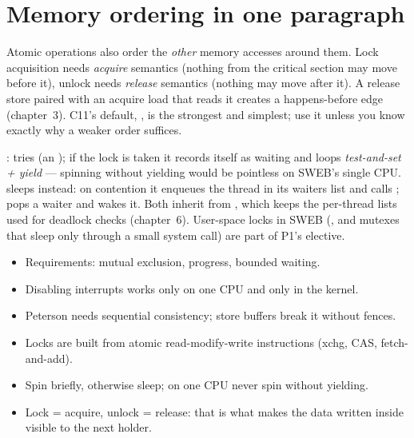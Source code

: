 \section{Memory ordering in one paragraph}

Atomic operations also order the \emph{other} memory accesses around
them. Lock acquisition needs \emph{acquire} semantics (nothing from the
critical section may move before it), unlock needs \emph{release}
semantics (nothing may move after it). A release store paired with an
acquire load that reads it creates a happens-before edge (chapter~3).
C11's default, , is the strongest and
simplest; use it unless you know exactly why a weaker order suffices.

\begin{swebbox}
:  tries
 (an ); if the lock is taken it
records itself as waiting and loops \emph{test-and-set + yield} ---
spinning without yielding would be pointless on SWEB's single CPU.
 sleeps instead: on contention it enqueues the thread in its
waiters list and calls ;  pops a
waiter and wakes it. Both inherit from , which keeps the
per-thread lists used for deadlock checks (chapter~6). User-space locks
in SWEB (, and mutexes that sleep only through a
small system call) are part of P1's elective.
\end{swebbox}

\begin{keybox}
\begin{itemize}
  \item Requirements: mutual exclusion, progress, bounded waiting.
  \item Disabling interrupts works only on one CPU and only in the kernel.
  \item Peterson needs sequential consistency; store buffers break it
    without fences.
  \item Locks are built from atomic read-modify-write instructions
    (xchg, CAS, fetch-and-add).
  \item Spin briefly, otherwise sleep; on one CPU never spin without
    yielding.
  \item Lock = acquire, unlock = release: that is what makes the data
    written inside visible to the next holder.
\end{itemize}
\end{keybox}
